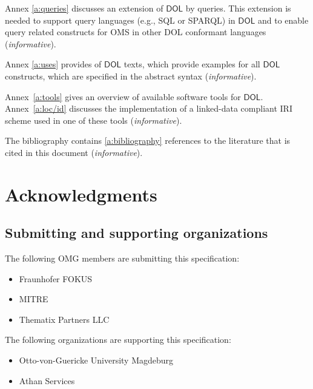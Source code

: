 \documentclass[10pt,fleqn,final]{scrreprt}
\newcommand*{\DOL}{\ensuremath{\mathsf{DOL}}\xspace}
\newenvironment{definitions}[0]{\medskip }{}
\begin{document}
\begin{definitions}
\medskip \noindent 
Annex \ref{a:queries} discusses an extension of \DOL{} by queries. This extension is needed
to support query languages (e.g., SQL or SPARQL) in \DOL{} and to enable query related constructs
for OMS in other DOL conformant languages (\emph{informative}). 

\medskip \noindent 
Annex \ref{a:uses} provides of \DOL texts, which provide examples for all \DOL constructs, which 
are specified in the abstract syntax 
(\emph{informative}).

Annex~\ref{a:tools} gives an overview of available  software tools for
\DOL.  Annex~\ref{a:loc/id} discusses the implementation of a
linked-data compliant IRI scheme used in one of these tools
(\emph{informative}).

\medskip \noindent 
The bibliography contains \ref{a:bibliography} references to the literature that is cited in this document
(\emph{informative}).





\section{Acknowledgments}
\subsection{Submitting and supporting organizations}
The following  OMG  members are submitting this specification:
	\begin{itemize}
		\item Fraunhofer FOKUS
		\item MITRE		
		\item Thematix Partners LLC
	\end{itemize}
The following organizations are supporting this specification: 
	\begin{itemize}
		\item Otto-von-Guericke University Magdeburg 
		\item Athan Services 
	\end{itemize}





\end{definitions}
\end{document}
